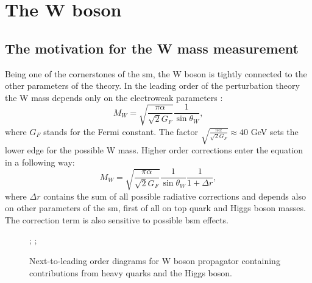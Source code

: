 \chapter{The W boson}
    
   
        
    	\section{The motivation for the W mass measurement}    
        Being one of the cornerstones of the \gls{sm}, the W boson is tightly connected to the other parameters of the theory. In the leading order of the perturbation theory the W mass depends only on the electroweak parameters \cite{Awramik}:
        \begin{equation}
        M_W=\sqrt{\frac{\pi \alpha}{\sqrt{2}G_F}}\frac{1}{\sin{\theta_W}},
        \end{equation}
        where $G_F$ stands for the Fermi constant. The factor $\sqrt{\frac{\pi \alpha}{\sqrt{2}G_F}} \approx 40$ GeV sets the lower edge for the possible W mass. Higher order corrections enter the equation in a following way:
        \begin{equation}
        M_W=\sqrt{\frac{\pi \alpha}{\sqrt{2}G_F}}\frac{1}{\sin{\theta_W}}\frac{1}{1+\Delta r},
        \end{equation}
        where $\Delta r $ contains the sum of all possible radiative corrections and depends also on other parameters of the \gls{sm}, first of all on top quark and Higgs boson masses. The correction term is also sensitive to possible \gls{bsm} effects.
        \begin{figure}
        	\label{fig::mw_cor}
        	\centering
        	;
        		\;  \; \; \; 
        	;
        	\caption{ Next-to-leading order diagrams for W boson propagator containing contributions from heavy quarks and the Higgs boson.}
        \end{figure}

